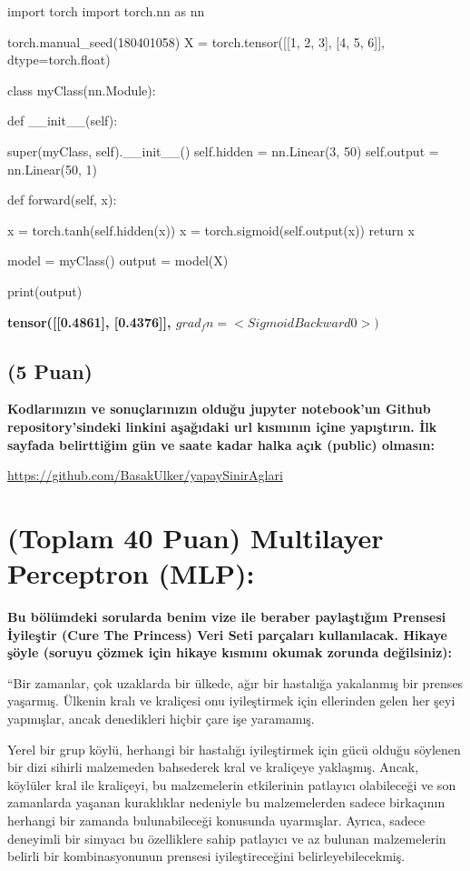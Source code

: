 \documentclass[11pt]{article}
\begin{document}
\begin{python}
import torch
import torch.nn as nn

torch.manual_seed(180401058)
X = torch.tensor([[1, 2, 3], [4, 5, 6]], dtype=torch.float)

class myClass(nn.Module):

    def __init__(self):

        super(myClass, self).__init__()
        self.hidden = nn.Linear(3, 50)
        self.output = nn.Linear(50, 1)

    def forward(self, x):

        x = torch.tanh(self.hidden(x))
        x = torch.sigmoid(self.output(x))
        return x

model = myClass()
output = model(X)

print(output)
\end{python}

\textbf{tensor([[0.4861], [0.4376]], $grad_fn=<SigmoidBackward0>)$}

\subsection{(5 Puan)} \textbf{Kodlarınızın ve sonuçlarınızın olduğu jupyter notebook'un Github repository'sindeki linkini aşağıdaki url kısmının içine yapıştırın. İlk sayfada belirttiğim gün ve saate kadar halka açık (public) olmasın:}

\url{https://github.com/BasakUlker/yapaySinirAglari}

\section{(Toplam 40 Puan) Multilayer Perceptron (MLP):} 
\textbf{Bu bölümdeki sorularda benim vize ile beraber paylaştığım Prensesi İyileştir (Cure The Princess) Veri Seti parçaları kullanılacak. Hikaye şöyle (soruyu çözmek için hikaye kısmını okumak zorunda değilsiniz):} 

``Bir zamanlar, çok uzaklarda bir ülkede, ağır bir hastalığa yakalanmış bir prenses yaşarmış. Ülkenin kralı ve kraliçesi onu iyileştirmek için ellerinden gelen her şeyi yapmışlar, ancak denedikleri hiçbir çare işe yaramamış.

Yerel bir grup köylü, herhangi bir hastalığı iyileştirmek için gücü olduğu söylenen bir dizi sihirli malzemeden bahsederek kral ve kraliçeye yaklaşmış. Ancak, köylüler kral ile kraliçeyi, bu malzemelerin etkilerinin patlayıcı olabileceği ve son zamanlarda yaşanan kuraklıklar nedeniyle bu malzemelerden sadece birkaçının herhangi bir zamanda bulunabileceği konusunda uyarmışlar. Ayrıca, sadece deneyimli bir simyacı bu özelliklere sahip patlayıcı ve az bulunan malzemelerin belirli bir kombinasyonunun prensesi iyileştireceğini belirleyebilecekmiş.
\end{document}
